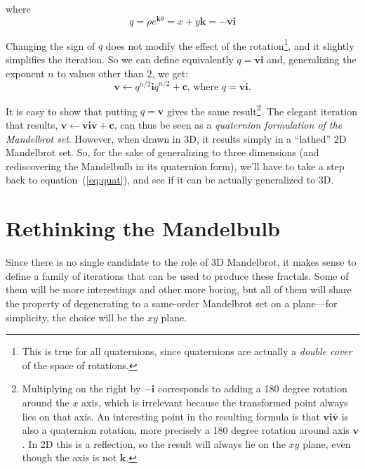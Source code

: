 \documentclass{article}
\let\vec\mathbf
\let\bar\overline
\newcommand{\where}{\text{, where }}
\begin{document}
\noindent
where
\begin{equation*}
q = \rho e^{\vec{k}\theta} = x + y\vec{k} = -\vec{v}\vec{i}
\end{equation*}

\noindent
Changing the sign of $q$ does not modify the effect of the
rotation\footnote{This is true for all quaternions, since quaternions
  are actually a \emph{double cover} of the space of rotations.}, and
it slightly simplifies the iteration.  So we can define equivalently
$q=\vec{v}\vec{i}$ and, generalizing the exponent $n$ to values other
than $2$, we get:
\begin{equation}
\label{eq:quat}
\vec{v}\leftarrow q^{n/2} \vec{i} \bar q^{n/2}+\vec{c} \where q=\vec{v}\vec{i}.
\end{equation}

\noindent
It is easy to show that putting $q=\vec{v}$ gives the same
result\footnote{Multiplying on the right by $\vec{-i}$ corresponds to
  adding a 180 degree rotation around the $x$ axis, which is
  irrelevant because the transformed point always lies on that axis.
  An interesting point in the resulting formula is that
  $\vec{v}\vec{i}\vec{\bar v}$ is also a quaternion rotation, more
  precisely a 180 degree rotation around axis $\vec{v}$.  In 2D this
  is a reflection, so the result will always lie on the $xy$ plane,
  even though the axis is not $\vec{k}$.}.  The elegant iteration that
results, $\vec{v}\leftarrow\vec{v} \vec{i} \vec{\bar v}+\vec{c}$, can
thus be seen as a \emph{quaternion formulation of the Mandelbrot set}.
However, when drawn in 3D, it results simply in a ``lathed'' 2D
Mandelbrot set.  So, for the sake of generalizing to three dimensions
(and rediscovering the Mandelbulb in its quaternion form), we'll have
to take a step back to equation~(\ref{eq:quat}), and see if it can be
actually generalized to 3D.

\section{Rethinking the Mandelbulb}
\label{sec:quatbulb}

Since there is no single candidate to the role of 3D Mandelbrot, it
makes sense to define a family of iterations that can be used to
produce these fractals.  Some of them will be more interestings and
other more boring, but all of them will share the property of
degenerating to a same-order Mandelbrot set on a plane---for
simplicity, the choice will be the $xy$ plane.
\end{document}
